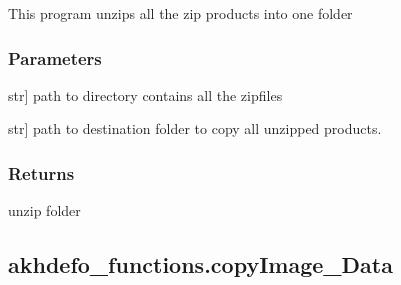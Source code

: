 \documentclass[letterpaper,10pt]{sphinxmanual}
\begin{document}
\begin{fulllineitems}
\label{\detokenize{generated/akhdefo_functions.unzip:akhdefo_functions.unzip}}
\pysigstartsignatures
{}
\pysigstopsignatures
\sphinxAtStartPar
This program unzips all the zip products into one folder


\subsubsection{Parameters}
\label{\detokenize{generated/akhdefo_functions.unzip:parameters}}\begin{description}
\sphinxlineitem{zipdir}{[}str{]}
\sphinxAtStartPar
path to directory contains all the zipfiles

\sphinxlineitem{dst\_dir}{[}str{]}
\sphinxAtStartPar
path to destination folder to copy all unzipped products.

\end{description}


\subsubsection{Returns}
\label{\detokenize{generated/akhdefo_functions.unzip:returns}}
\sphinxAtStartPar
unzip folder

\end{fulllineitems}


\sphinxstepscope


\subsection{akhdefo\_functions.copyImage\_Data}
\label{\detokenize{generated/akhdefo_functions.copyImage_Data:akhdefo-functions-copyimage-data}}\label{\detokenize{generated/akhdefo_functions.copyImage_Data::doc}}
\end{document}
